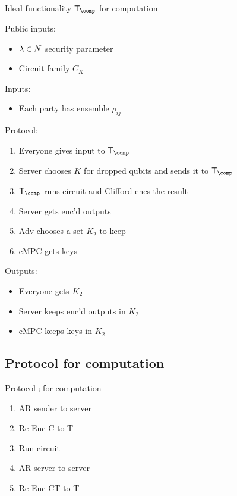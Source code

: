 \begin{protocol}{Ideal functionality $\trustp_\comp$ for computation}

	Public inputs:
	\begin{itemize}
		\item $\lambda\in\relax{N}$ security parameter
		\item Circuit family $C_K$
	\end{itemize}

	Inputs:
	\begin{itemize}
		\item Each party has ensemble $\rho_{ij}$
	\end{itemize}

	Protocol:
	\begin{enumerate}
		\item Everyone gives input to $\trustp_\comp$
		\item Server chooses $K$ for dropped qubits and sends it to $\trustp_\comp$
		\item $\trustp_\comp$ runs circuit and Clifford encs the result
		\item Server gets enc'd outputs
		\item Adv chooses a set $K_2$ to keep
		\item cMPC gets keys
	\end{enumerate}

	Outputs:
	\begin{itemize}
		\item Everyone gets $K_2$
		\item Server keeps enc'd outputs in $K_2$
		\item cMPC keeps keys in $K_2$
	\end{itemize}
\end{protocol}

\subsection{Protocol for computation}

\begin{protocol}{Protocol $\comp$ for computation}

	\begin{enumerate}
		\item AR sender to server
		\item Re-Enc C to T
		\item Run circuit
		\item AR server to server
		\item Re-Enc CT to T
	\end{enumerate}

\end{protocol}

